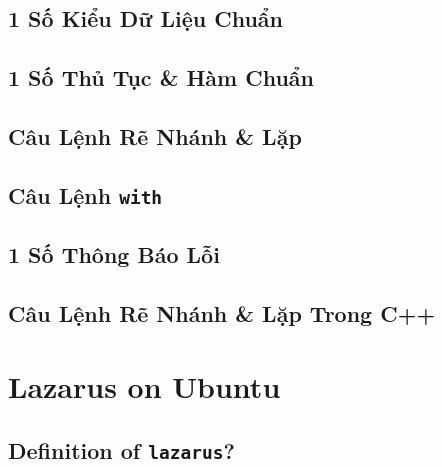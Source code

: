 \documentclass[oneside]{book}
\numberwithin{equation}{section}
\begin{document}

\section{1 Số Kiểu Dữ Liệu Chuẩn}


\section{1 Số Thủ Tục \& Hàm Chuẩn}


\section{Câu Lệnh Rẽ Nhánh \& Lặp}


\section{Câu Lệnh \texttt{with}}


\section{1 Số Thông Báo Lỗi}


\section{Câu Lệnh Rẽ Nhánh \& Lặp Trong C++}


\chapter{Lazarus on Ubuntu}

\section{Definition of \texttt{lazarus}?}
\end{document}
